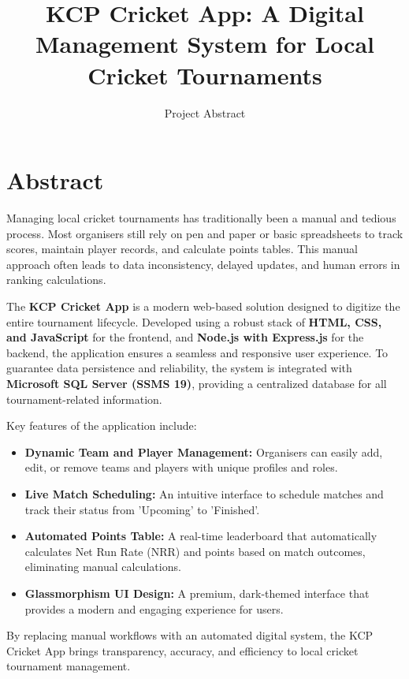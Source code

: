 \documentclass[12pt, a4paper]{article}
\title{\textbf{\Large KCP Cricket App: A Digital Management System for Local Cricket Tournaments}}
\author{Project Abstract}
\date{}
\begin{document}
\maketitle

\section*{Abstract}
{\fontsize{12}{15}\selectfont
Managing local cricket tournaments has traditionally been a manual and tedious process. Most organisers still rely on pen and paper or basic spreadsheets to track scores, maintain player records, and calculate points tables. This manual approach often leads to data inconsistency, delayed updates, and human errors in ranking calculations. 

The \textbf{KCP Cricket App} is a modern web-based solution designed to digitize the entire tournament lifecycle. Developed using a robust stack of \textbf{HTML, CSS, and JavaScript} for the frontend, and \textbf{Node.js with Express.js} for the backend, the application ensures a seamless and responsive user experience. To guarantee data persistence and reliability, the system is integrated with \textbf{Microsoft SQL Server (SSMS 19)}, providing a centralized database for all tournament-related information.

Key features of the application include:
\begin{itemize}
    \item \textbf{Dynamic Team and Player Management:} Organisers can easily add, edit, or remove teams and players with unique profiles and roles.
    \item \textbf{Live Match Scheduling:} An intuitive interface to schedule matches and track their status from 'Upcoming' to 'Finished'.
    \item \textbf{Automated Points Table:} A real-time leaderboard that automatically calculates Net Run Rate (NRR) and points based on match outcomes, eliminating manual calculations.
    \item \textbf{Glassmorphism UI Design:} A premium, dark-themed interface that provides a modern and engaging experience for users.
\end{itemize}

By replacing manual workflows with an automated digital system, the KCP Cricket App brings transparency, accuracy, and efficiency to local cricket tournament management.
}
\end{document}
